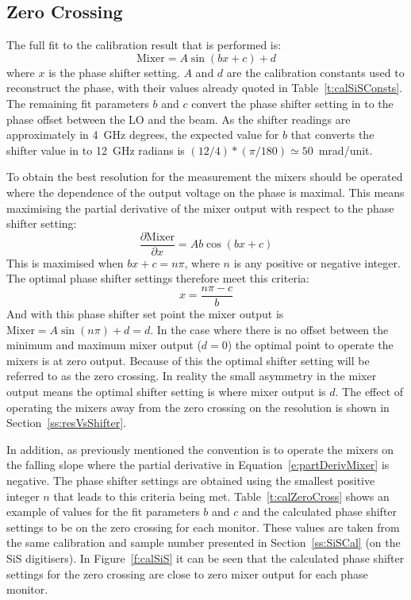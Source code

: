 \subsection{Zero Crossing}
\label{ss:calZeroCross}

The full fit to the calibration result that is performed is:
\begin{equation}
\mathrm{Mixer} = A\sin(bx + c) + d
\end{equation}
where \(x\) is the phase shifter setting. \(A\) and \(d\) are the calibration constants used to reconstruct the phase, with their values already quoted in Table~\ref{t:calSiSConsts}. The remaining fit parameters \(b\) and \(c\) convert the phase shifter setting in to the phase offset between the LO and the beam. As the shifter readings are approximately in 4~GHz degrees, the expected value for \(b\) that converts the shifter value in to 12~GHz radians is \((12/4)*(\pi/180) \simeq 50\)~mrad/unit.

To obtain the best resolution for the measurement the mixers should be operated where the dependence of the output voltage on the phase is maximal. This means maximising the partial derivative of the mixer output with respect to the phase shifter setting:
\begin{equation}
\frac{\partial \mathrm{Mixer}}{\partial x} = Ab\cos(bx+c)
\label{e:partDerivMixer}
\end{equation}
This is maximised when \(bx + c = n\pi\), where \(n\) is any positive or negative integer. The optimal phase shifter settings therefore meet this criteria:
\begin{equation}
x = \frac{n\pi-c}{b}
\end{equation}
And with this phase shifter set point the mixer output is \(\mathrm{Mixer} = A\sin(n\pi)+d = d\). In the case where there is no offset between the minimum and maximum mixer output (\(d=0\)) the optimal point to operate the mixers is at zero output. Because of this the optimal shifter setting will be referred to as the zero crossing. In reality the small asymmetry in the mixer output means the optimal shifter setting is where mixer output is \(d\). The effect of operating the mixers away from the zero crossing on the resolution is shown in Section~\ref{ss:resVsShifter}.

In addition, as previously mentioned the convention is to operate the mixers on the falling slope where the partial derivative in Equation~\ref{e:partDerivMixer} is negative. The phase shifter settings are obtained using the smallest positive integer \(n\) that leads to this criteria being met. Table~\ref{t:calZeroCross} shows an example of values for the fit parameters \(b\) and \(c\) and the calculated phase shifter settings to be on the zero crossing for each monitor. These values are taken from the same calibration and sample number presented in Section~\ref{ss:SiSCal} (on the SiS digitisers). In Figure~\ref{f:calSiS} it can be seen that the calculated phase shifter settings for the zero crossing are close to zero mixer output for each phase monitor.

